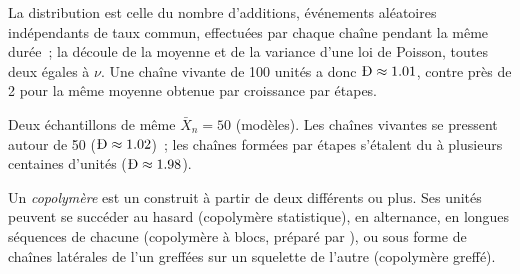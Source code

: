 \admitted

La distribution est celle du nombre d'additions, événements aléatoires indépendants de taux commun,
effectuées par chaque chaîne pendant la même durée~; la  découle de la moyenne et de la variance
d'une loi de Poisson, toutes deux égales à $\nu$. Une chaîne vivante de 100 unités a donc $\text{\DH} \approx 1.01$,
contre près de 2 pour la même moyenne obtenue par croissance par étapes.

\begin{omfigure}

{\small Deux échantillons de même $\bar X_n = 50$ (modèles). Les chaînes vivantes se pressent autour de 50 ($\text{\DH}
\approx 1.02$)~; les chaînes formées par étapes s'étalent du  à plusieurs centaines d'unités ($\text{\DH} \approx
1.98$).}
\end{omfigure}

\begin{definition}[Copolymère]\label{def:b2:polymer-synthesis:copolymer}
Un \emph{copolymère} est un  construit à partir de deux 
différents ou plus. Ses unités peuvent se succéder au hasard (copolymère statistique), en alternance, en
longues séquences de chacune (copolymère à blocs, préparé par ), ou sous forme de
chaînes latérales de l'un greffées sur un squelette de l'autre (copolymère greffé).
\end{definition}

